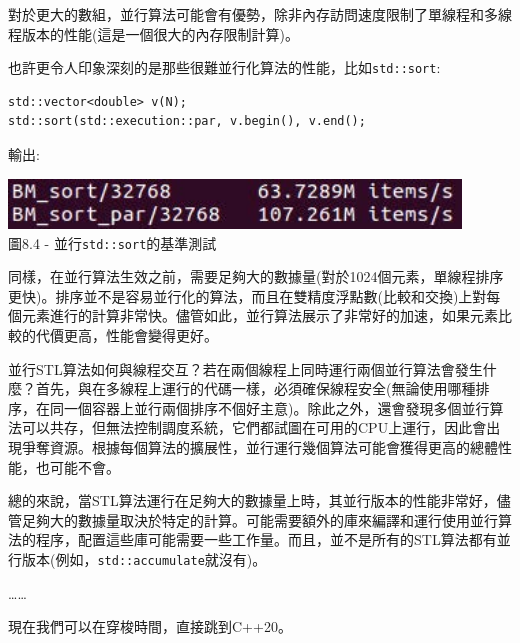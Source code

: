 對於更大的數組，並行算法可能會有優勢，除非內存訪問速度限制了單線程和多線程版本的性能(這是一個很大的內存限制計算)。

也許更令人印象深刻的是那些很難並行化算法的性能，比如\texttt{std::sort}:

\begin{lstlisting}[style=styleCXX]
std::vector<double> v(N);
std::sort(std::execution::par, v.begin(), v.end();
\end{lstlisting}

輸出:

\begin{center}
\includegraphics[width=0.9\textwidth]{content/2/chapter8/images/4.jpg}\\
圖8.4 - 並行\texttt{std::sort}的基準測試
\end{center}

同樣，在並行算法生效之前，需要足夠大的數據量(對於1024個元素，單線程排序更快)。排序並不是容易並行化的算法，而且在雙精度浮點數(比較和交換)上對每個元素進行的計算非常快。儘管如此，並行算法展示了非常好的加速，如果元素比較的代價更高，性能會變得更好。 

並行STL算法如何與線程交互？若在兩個線程上同時運行兩個並行算法會發生什麼？首先，與在多線程上運行的代碼一樣，必須確保線程安全(無論使用哪種排序，在同一個容器上並行兩個排序不個好主意)。除此之外，還會發現多個並行算法可以共存，但無法控制調度系統，它們都試圖在可用的CPU上運行，因此會出現爭奪資源。根據每個算法的擴展性，並行運行幾個算法可能會獲得更高的總體性能，也可能不會。

總的來說，當STL算法運行在足夠大的數據量上時，其並行版本的性能非常好，儘管足夠大的數據量取決於特定的計算。可能需要額外的庫來編譯和運行使用並行算法的程序，配置這些庫可能需要一些工作量。而且，並不是所有的STL算法都有並行版本(例如，\texttt{std::accumulate}就沒有)。

……

現在我們可以在穿梭時間，直接跳到C++20。














